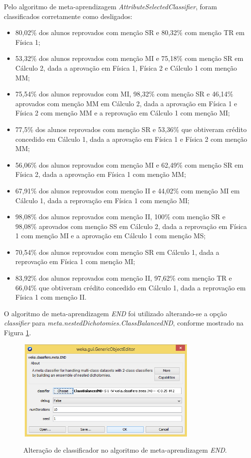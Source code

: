 Pelo algoritmo de meta-aprendizagem \textit{AttributeSelectedClassifier}, foram classificados corretamente como desligados:
\begin{itemize}
	\item 80,02\% dos alunos reprovados com menção SR e 80,32\% com menção TR em Física 1;
	\item 53,32\% dos alunos reprovados com menção MI e 75,18\% com menção SR em Cálculo 2, dada a aprovação em Física 1, Física 2 e Cálculo 1 com menção MM;
	\item 75,54\% dos alunos reprovados com MI, 98,32\% com menção SR e 46,14\% aprovados com menção MM em Cálculo 2, dada a aprovação em Física 1 e Física 2 com menção MM e a reprovação em Cálculo 1 com menção MI;
	\item 77,5\% dos alunos reprovados com menção SR e 53,36\% que obtiveram crédito concedido em Cálculo 1, dada a aprovação em Física 1 e Física 2 com menção MM;
	\item 56,06\% dos alunos reprovados com menção MI e 62,49\% com menção SR em Física 2, dada a aprovação em Física 1 com menção MM;
	\item 67,91\% dos alunos reprovados com menção II e 44,02\% com menção MI em Cálculo 1, dada a reprovação em Física 1 com menção MI;
	\item 98,08\% dos alunos reprovados com menção II, 100\% com menção SR e 98,08\% aprovados com menção SS em Cálculo 2, dada a reprovação em Física 1 com menção MI e a aprovação em Cálculo 1 com menção MS;
	\item 70,54\% dos alunos reprovados com menção SR em Cálculo 1, dada a reprovação em Física 1 com menção MI;
	\item 83,92\% dos alunos reprovados com menção II, 97,62\% com menção TR e 66,04\% que obtiveram crédito concedido em Cálculo 1, dada a reprovação em Física 1 com menção II.
\end{itemize}

O algoritmo de meta-aprendizagem \textit{END} foi utilizado alterando-se a opção \textit{classifier} para \textit{meta.nestedDichotomies.ClassBalancedND}, conforme mostrado na Figura \ref{end}. 

\begin{figure}[!h]
	\centering
	{\includegraphics[width=9cm, height=5cm]{images/altera_end}}
	\caption {Alteração de classificador no algoritmo de meta-aprendizagem \textit{END}.}
	\label{end}
\end{figure}

